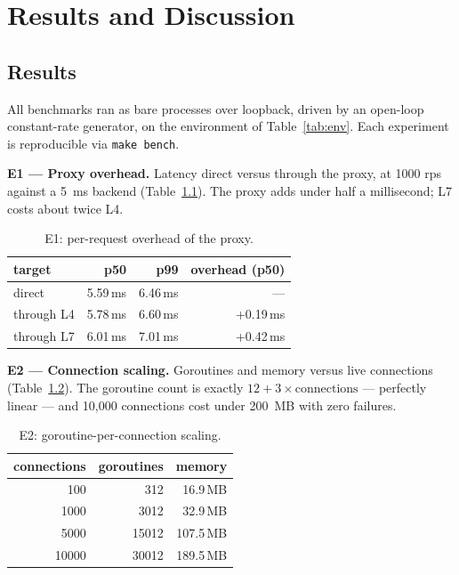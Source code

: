 \documentclass[11pt,a4paper]{report}
\newcommand{\code}[1]{\texttt{#1}}
\begin{document}
\chapter{Results and Discussion}

\section{Results}
All benchmarks ran as bare processes over loopback, driven by an open-loop constant-rate
generator, on the environment of Table~\ref{tab:env}. Each experiment is reproducible via
\code{make bench}.

\textbf{E1 --- Proxy overhead.} Latency direct versus through the proxy, at 1000 rps against a
5~ms backend (Table~\ref{tab:e1}). The proxy adds under half a millisecond; L7 costs about twice
L4.

\begin{table}[htbp]
\centering
\caption{E1: per-request overhead of the proxy.}
\label{tab:e1}
\begin{tabular}{lrrr}
\toprule
target & p50 & p99 & overhead (p50)\\
\midrule
direct     & 5.59\,ms & 6.46\,ms & ---\\
through L4 & 5.78\,ms & 6.60\,ms & +0.19\,ms\\
through L7 & 6.01\,ms & 7.01\,ms & +0.42\,ms\\
\bottomrule
\end{tabular}
\end{table}

\textbf{E2 --- Connection scaling.} Goroutines and memory versus live connections
(Table~\ref{tab:e2}). The goroutine count is exactly $12 + 3 \times \text{connections}$ ---
perfectly linear --- and 10{,}000 connections cost under 200~MB with zero failures.

\begin{table}[htbp]
\centering
\caption{E2: goroutine-per-connection scaling.}
\label{tab:e2}
\begin{tabular}{rrr}
\toprule
connections & goroutines & memory\\
\midrule
100   & 312   & 16.9\,MB\\
1000  & 3012  & 32.9\,MB\\
5000  & 15012 & 107.5\,MB\\
10000 & 30012 & 189.5\,MB\\
\bottomrule
\end{tabular}
\end{table}
\end{document}
